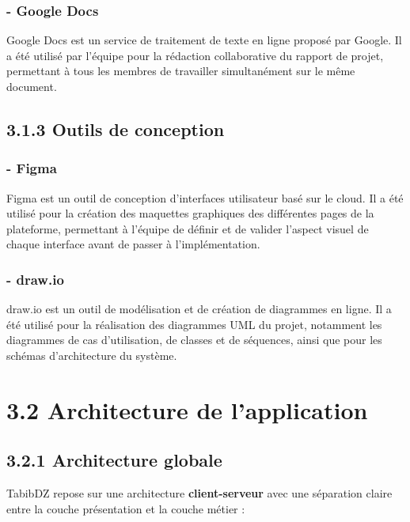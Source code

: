 \documentclass[12pt,a4paper]{report}
\begin{document}
\subsubsection*{- Google Docs}

Google Docs est un service de traitement de texte en ligne propos\'e par Google. Il a \'et\'e utilis\'e par l'\'equipe pour la r\'edaction collaborative du rapport de projet, permettant \`a tous les membres de travailler simultan\'ement sur le m\^eme document.

\subsection*{3.1.3 Outils de conception}

\subsubsection*{- Figma}

Figma est un outil de conception d'interfaces utilisateur bas\'e sur le cloud. Il a \'et\'e utilis\'e pour la cr\'eation des maquettes graphiques des diff\'erentes pages de la plateforme, permettant \`a l'\'equipe de d\'efinir et de valider l'aspect visuel de chaque interface avant de passer \`a l'impl\'ementation.

\subsubsection*{- draw.io}

draw.io est un outil de mod\'elisation et de cr\'eation de diagrammes en ligne. Il a \'et\'e utilis\'e pour la r\'ealisation des diagrammes UML du projet, notamment les diagrammes de cas d'utilisation, de classes et de s\'equences, ainsi que pour les sch\'emas d'architecture du syst\`eme.

\section*{3.2 Architecture de l'application}

\subsection*{3.2.1 Architecture globale}

TabibDZ repose sur une architecture \textbf{client-serveur} avec une s\'eparation claire entre la couche pr\'esentation et la couche m\'etier :
\end{document}
